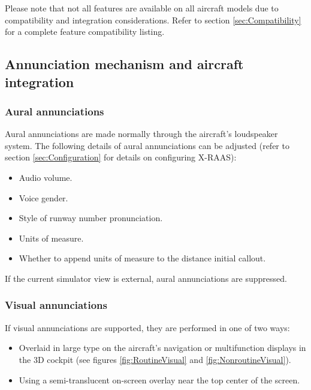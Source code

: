 \documentclass[a4paper,12pt]{article}
\begin{document}
Please note that not all features are available on all aircraft models
due to compatibility and integration considerations. Refer to section
\ref{sec:Compatibility} for a complete feature compatibility listing.

\subsection{Annunciation mechanism and aircraft integration}
\label{sec:AnnunciationMechanism}

\subsubsection{Aural annunciations}
\label{subsec:AuralAnnunciations}

Aural annunciations are made normally through the aircraft's loudspeaker
system. The following details of aural annunciations can be adjusted
(refer to section \ref{sec:Configuration} for details on configuring X-RAAS):

\begin{itemize}

\item Audio volume.

\item Voice gender.

\item Style of runway number pronunciation.

\item Units of measure.

\item Whether to append units of measure to the distance initial callout.

\end{itemize}

\noindent If the current simulator view is external, aural annunciations
are suppressed.

\subsubsection{Visual annunciations}
\label{subsec:VisualAnnunciations}

If visual annunciations are supported, they are performed in one of two
ways:

\begin{itemize}

\item Overlaid in large type on the aircraft's navigation or
multifunction displays in the 3D cockpit (see figures
\ref{fig:RoutineVisual} and \ref{fig:NonroutineVisual}).

\item Using a semi-translucent on-screen overlay near the top center of
the screen.

\end{itemize}
\end{document}

